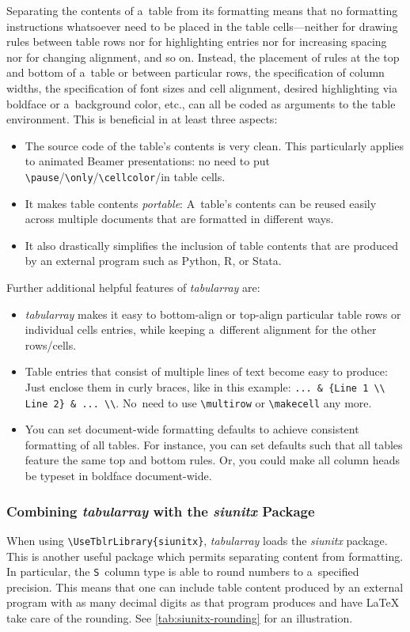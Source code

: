 \documentclass[11pt, a4paper, oneside]{article}
\theoremstyle{Plain}
\theoremstyle{Definition}
\theoremstyle{Remark}
\begin{document}
Separating the contents of a~table from its formatting means that no formatting instructions whatsoever need to be placed in the table cells---neither for drawing rules between table rows nor for highlighting entries nor for increasing spacing nor for changing alignment, and so on. Instead, the placement of rules at the top and bottom of a~table or between particular rows, the specification of column widths, the specification of font sizes and cell alignment, desired highlighting via boldface or a~background color, etc., can all be coded as arguments to the table environment. This is beneficial in at least three aspects:
\begin{itemize}
	\item The source code of the table's contents is very clean. This particularly applies to animated Beamer presentations: no need to put \verb|\pause|\slash \verb|\only|\slash \verb|\cellcolor|\slash\textellipsis in table cells.
	\item  It makes table contents \emph{portable}: A~table's contents can be reused easily across multiple documents that are formatted in different ways.
	\item  It also drastically simplifies the inclusion of table contents that are produced by an external program such as Python, R, or Stata.
\end{itemize}

Further additional helpful features of \mbox{\textit{tabularray}} are:
\begin{itemize}
	\item \mbox{\textit{tabularray}} makes it easy to bottom-align or top-align particular table rows or individual cells entries, while keeping a~different alignment for the other rows\slash cells.
	\item Table entries that consist of multiple lines of text become easy to produce: Just enclose them in curly braces, like in this example: \verb|... & {Line 1 \\ Line 2} & ... \\|. No~need to use \verb|\multirow| or \verb|\makecell| any more.
	\item You can set document-wide formatting defaults to achieve consistent formatting of all tables. For instance, you can set defaults such that all tables feature the same top and bottom rules. Or, you could make all column heads be typeset in boldface document-wide.
\end{itemize}

\subsubsection{Combining \mbox{\textit{tabularray}} with the \textit{siunitx} Package}
When using \verb|\UseTblrLibrary{siunitx}|, \mbox{\textit{tabularray}} loads the \mbox{\textit{siunitx}} package. This is another useful package which permits separating content from formatting. In particular, the \verb|S|~column type is able to round numbers to a~specified precision. This means that one can include table content produced by an external program with as many decimal digits as that program produces and have LaTeX take care of the rounding. See \autoref{tab:siunitx-rounding} for an illustration.
\end{document}
